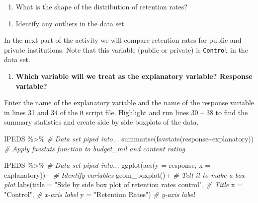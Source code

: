 \documentclass[
]{report}
\newenvironment{Shaded}{\begin{snugshade}}{\end{snugshade}}
\newcommand{\AttributeTok}[1]{\textcolor[rgb]{0.77,0.63,0.00}{#1}}
\newcommand{\CommentTok}[1]{\textcolor[rgb]{0.56,0.35,0.01}{\textit{#1}}}
\newcommand{\FunctionTok}[1]{\textcolor[rgb]{0.00,0.00,0.00}{#1}}
\newcommand{\NormalTok}[1]{#1}
\newcommand{\SpecialCharTok}[1]{\textcolor[rgb]{0.00,0.00,0.00}{#1}}
\newcommand{\StringTok}[1]{\textcolor[rgb]{0.31,0.60,0.02}{#1}}
\providecommand{\tightlist}{%
  \setlength{\itemsep}{0pt}\setlength{\parskip}{0pt}}
\begin{document}
\begin{enumerate}
\def\labelenumi{\arabic{enumi}.}
\setcounter{enumi}{8}
\tightlist
\item
  What is the shape of the distribution of retention rates?
\end{enumerate}

\vspace{0.3in}

\begin{enumerate}
\def\labelenumi{\arabic{enumi}.}
\setcounter{enumi}{9}
\tightlist
\item
  Identify any outliers in the data set.
\end{enumerate}

\vspace{0.3in}

In the next part of the activity we will compare retention rates for public and private institutions. Note that this variable (public or private) is \texttt{Control} in the data set.

\begin{enumerate}
\def\labelenumi{\arabic{enumi}.}
\setcounter{enumi}{10}
\tightlist
\item
  \textbf{Which variable will we treat as the explanatory variable? Response variable?}
\end{enumerate}

\vspace{0.8in}

Enter the name of the explanatory variable and the name of the response variable in lines 31 and 34 of the \texttt{R} script file. Highlight and run lines 30 -- 38 to find the summary statistics and create side by side boxplots of the data.

\begin{Shaded}
\begin{Highlighting}[]
\NormalTok{IPEDS }\SpecialCharTok{\%\textgreater{}\%}  \CommentTok{\# Data set piped into...}
  \FunctionTok{summarise}\NormalTok{(}\FunctionTok{favstats}\NormalTok{(response}\SpecialCharTok{\textasciitilde{}}\NormalTok{explanatory)) }\CommentTok{\# Apply favstats function to budget\_mil and content rating}
\end{Highlighting}
\end{Shaded}

\begin{Shaded}
\begin{Highlighting}[]
\NormalTok{IPEDS }\SpecialCharTok{\%\textgreater{}\%}  \CommentTok{\# Data set piped into...}
  \FunctionTok{ggplot}\NormalTok{(}\FunctionTok{aes}\NormalTok{(}\AttributeTok{y =}\NormalTok{ response, }\AttributeTok{x =}\NormalTok{ explanatory))}\SpecialCharTok{+}  \CommentTok{\# Identify variables}
  \FunctionTok{geom\_boxplot}\NormalTok{()}\SpecialCharTok{+}  \CommentTok{\# Tell it to make a box plot}
  \FunctionTok{labs}\NormalTok{(}\AttributeTok{title =} \StringTok{"Side by side box plot of retention rates control"}\NormalTok{,  }\CommentTok{\# Title}
       \AttributeTok{x =} \StringTok{"Control"}\NormalTok{,    }\CommentTok{\# x{-}axis label}
       \AttributeTok{y =} \StringTok{"Retention Rates"}\NormalTok{)  }\CommentTok{\# y{-}axis label}
\end{Highlighting}
\end{Shaded}
\end{document}
